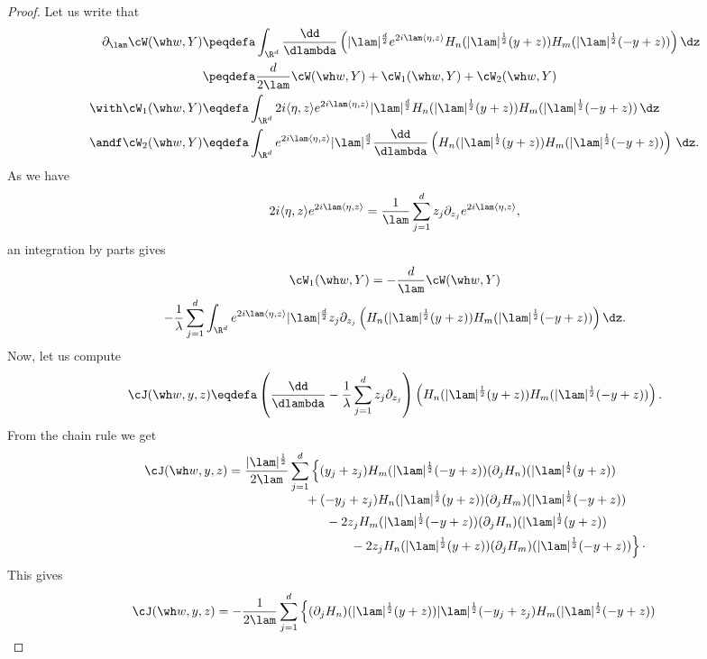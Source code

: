 \begin{proof}
Let us write that
\[
\begin{aligned}
\partial_\lam \cW(\wh w,Y) &\peqdefa \int_{\R^d} \frac{\dd}{\dlambda} \left(|\lam|^{\frac d 2} e^{2i\lam\langle \eta,z\rangle} H_n (|\lam|^{\frac 12} (y+z)) H_m(|\lam|^{\frac 12} (-y+z)) \right) \dz\\
&\peqdefa \frac d {2\lam} \cW(\wh w,Y) +\cW_1(\wh w,Y) + \cW_2(\wh w,Y) \\ \with
\cW_1(\wh w,Y) &\eqdefa
\int_{\R^d} 2i\langle \eta,z\rangle e^{2i\lam\langle \eta,z\rangle} |\lam|^{\frac d 2} H_n (|\lam|^{\frac 12} (y+z)) H_m(|\lam|^{\frac 12} (-y+z))\, \dz\\
\andf \cW_2(\wh w,Y) &\eqdefa
\int_{\R^d} e^{2i\lam\langle \eta,z\rangle} |\lam|^{\frac d 2} \frac{\dd}{\dlambda} \left(H_n (|\lam|^{\frac 12} (y+z)) H_m(|\lam|^{\frac 12} (-y+z))\right)\, \dz.
\end{aligned}
\]
As we have
\[
2i\langle \eta,z\rangle e^{2i\lam\langle \eta,z\rangle } = \frac 1 \lam \sum_{j=1}^d z_j\partial_{z_j} e^{2i\lam\langle \eta,z\rangle },
\]
an integration by parts gives
\begin{multline*}
\cW_1(\wh w,Y) = -\frac d {\lam} \cW(\wh w,Y)\\  -\frac1\lambda \sum_{j=1} ^d \int_{\R^d} e^{2i\lam\langle \eta,z\rangle} |\lam|^{\frac d 2} z_j\partial_{z_j} \left(H_n (|\lam|^{\frac 12} (y+z)) H_m(|\lam|^{\frac 12} (-y+z))\right) \dz.
\end{multline*}
Now, let us compute
\[
\cJ(\wh w,y,z) \eqdefa \left (\frac{\dd}{\dlambda} -\frac1\lambda\sum_{j=1}^d z_j\partial_{z_j}\right) \left(H_n (|\lam|^{\frac 12} (y+z)) H_m(|\lam|^{\frac 12} (-y+z))\right).
\]
From the chain rule we get
\begin{align*}
\cJ(\wh w,y,z) &= \frac {|\lam|^{\frac 12} }{2\lam} \sum_{j=1}^d \left\{ (y_j+z_j) H_m(|\lam|^{\frac 12} (-y+z)) (\partial_j H_n) (|\lam|^{\frac 12} (y+z))\right. \\[-0.5em]
&\mkern 110mu+(-y_j+z_j) H_n (|\lam|^{\frac 12} (y+z)) (\partial_j H_m)(|\lam|^{\frac 12} (-y+z))\\
&\mkern 140mu- 2 z_j H_m(|\lam|^{\frac 12} (-y+z)) (\partial_jH_n) (|\lam|^{\frac 12} (y+z))\\
&\mkern 170mu\left.{} -2 z_j H_n (|\lam|^{\frac 12} (y+z)) (\partial_j H_m)(|\lam|^{\frac 12} (-y+z))
\right\}\cdotp
\end{align*}
This gives
\begin{multline*}
\cJ(\wh w,y,z) = - \frac {1 }{2\lam} \sum_{j=1}^d \left\{ (\partial_j H_n) (|\lam|^{\frac 12} (y+z)) |\lam|^{\frac 12}(-y_j+z_j) H_m(|\lam|^{\frac 12} (-y+z))\right.\\[-0.3em]

\end{multline*}
\end{proof}
